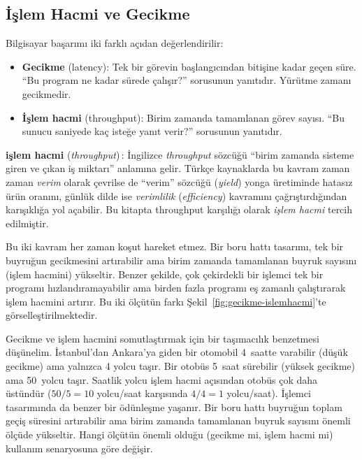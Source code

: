 \subsection{İşlem Hacmi ve Gecikme}
\label{subsec:verim-gecikme}

Bilgisayar başarımı iki farklı açıdan değerlendirilir:

\begin{itemize}
    \item \textbf{Gecikme} (latency): Tek bir görevin başlangıcından bitişine kadar geçen süre. ``Bu program ne kadar sürede çalışır?'' sorusunun yanıtıdır. Yürütme zamanı gecikmedir.
    \item \textbf{İşlem hacmi} (throughput): Birim zamanda tamamlanan görev sayısı. ``Bu sunucu saniyede kaç isteğe yanıt verir?'' sorusunun yanıtıdır.
\end{itemize}

\begin{terimnotu}
\textbf{işlem hacmi} (\emph{throughput})\,: İngilizce \emph{throughput} sözcüğü ``birim zamanda sisteme giren ve çıkan iş miktarı'' anlamına gelir. Türkçe kaynaklarda bu kavram zaman zaman \emph{verim} olarak çevrilse de ``verim'' sözcüğü (\emph{yield}) yonga üretiminde hatasız ürün oranını, günlük dilde ise \emph{verimlilik} (\emph{efficiency}) kavramını çağrıştırdığından karışıklığa yol açabilir. Bu kitapta throughput karşılığı olarak \emph{işlem hacmi} tercih edilmiştir.
\end{terimnotu}

Bu iki kavram her zaman koşut hareket etmez. Bir boru hattı tasarımı, tek bir buyruğun gecikmesini artırabilir ama birim zamanda tamamlanan buyruk sayısını (işlem hacmini) yükseltir. Benzer şekilde, çok çekirdekli bir işlemci tek bir programı hızlandıramayabilir ama birden fazla programı eş zamanlı çalıştırarak işlem hacmini artırır. Bu iki ölçütün farkı Şekil~\ref{fig:gecikme-islemhacmi}'te görselleştirilmektedir.

Gecikme ve işlem hacmini somutlaştırmak için bir taşımacılık benzetmesi düşünelim. İstanbul'dan Ankara'ya giden bir otomobil 4~saatte varabilir (düşük gecikme) ama yalnızca 4 yolcu taşır. Bir otobüs 5~saat sürebilir (yüksek gecikme) ama 50~yolcu taşır. Saatlik yolcu işlem hacmi açısından otobüs çok daha üstündür ($50/5 = 10$ yolcu/saat karşısında $4/4 = 1$ yolcu/saat). İşlemci tasarımında da benzer bir ödünleşme yaşanır. Bir boru hattı buyruğun toplam geçiş süresini artırabilir ama birim zamanda tamamlanan buyruk sayısını önemli ölçüde yükseltir. Hangi ölçütün önemli olduğu (gecikme mi, işlem hacmi mi) kullanım senaryosuna göre değişir.

